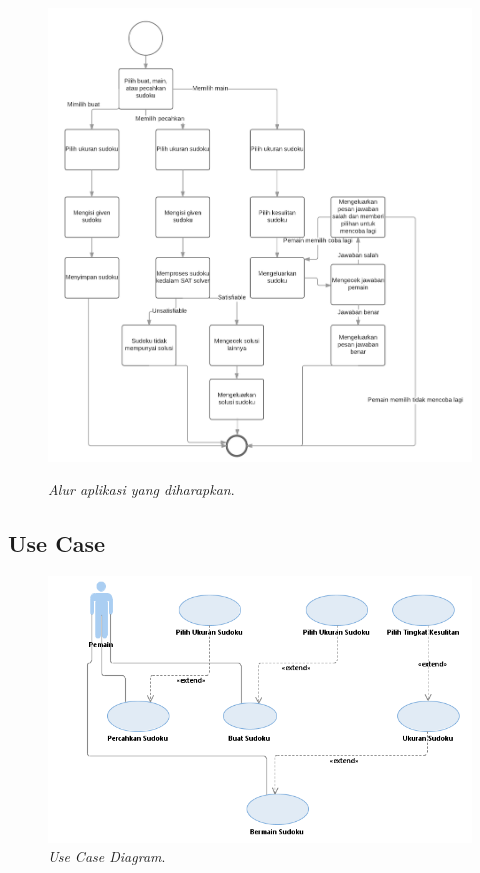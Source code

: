 \begin{figure}[H]
	\begin{centering}
		\includegraphics[scale=0.5]{gambar/alirAplikasi}
		\label{alirAplikasi}
		\caption{\textit{Alur aplikasi yang diharapkan}.}
	\end{centering}
\end{figure}

\subsection{Use Case}

\begin{figure}[H]
	\begin{centering}
		\includegraphics[scale=0.8]{gambar/useCase}
		
		\caption{\textit{Use Case Diagram}.}
	\end{centering}
\end{figure}

